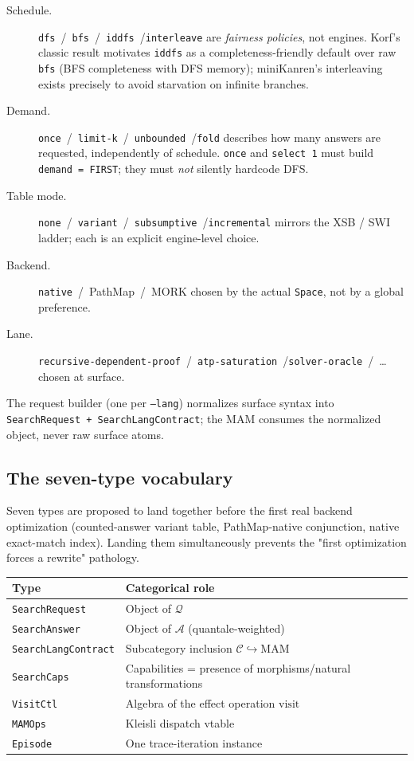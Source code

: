\documentclass[11pt]{article}
\newcommand{\code}[1]{\texttt{#1}}
\newcommand{\PathMap}{\textup{PathMap}}
\begin{document}
\begin{description}
\item[Schedule.]  \code{dfs}~/~\code{bfs}~/~\code{iddfs}~/\code{interleave}
  are \emph{fairness policies}, not engines.  Korf's classic result
  motivates \code{iddfs} as a completeness-friendly default over raw
  \code{bfs} (BFS completeness with DFS memory); miniKanren's
  interleaving exists precisely to avoid starvation on infinite
  branches.
\item[Demand.]  \code{once}~/~\code{limit-k}~/~\code{unbounded}~/\code{fold}
  describes how many answers are requested, independently of schedule.
  \code{once} and \code{select~1} must build \code{demand = FIRST};
  they must \emph{not} silently hardcode DFS.
\item[Table mode.]  \code{none}~/~\code{variant}~/~\code{subsumptive}~/\code{incremental}
  mirrors the XSB / SWI ladder; each is an explicit engine-level choice.
\item[Backend.]  \code{native}~/~\PathMap{}~/~MORK chosen by the
  actual \code{Space}, not by a global preference.
\item[Lane.]  \code{recursive-dependent-proof}~/~\code{atp-saturation}~/\code{solver-oracle}~/~\dots{}
  chosen at surface.
\end{description}

The request builder (one per \code{--lang}) normalizes surface syntax
into \code{SearchRequest~+~SearchLangContract}; the MAM consumes the
normalized object, never raw surface atoms.

\subsection{The seven-type vocabulary}

Seven types are proposed to land together before the first real
backend optimization (counted-answer variant table, \PathMap{}-native
conjunction, native exact-match index).  Landing them simultaneously
prevents the "first optimization forces a rewrite" pathology.

\begin{center}
\begin{tabular}{ll}
\toprule
\textbf{Type} & \textbf{Categorical role} \\
\midrule
\code{SearchRequest} & Object of $\mathcal{Q}$ \\
\code{SearchAnswer} & Object of $\mathcal{A}$ (quantale-weighted) \\
\code{SearchLangContract} & Subcategory inclusion $\mathcal{C} \hookrightarrow \mathrm{MAM}$ \\
\code{SearchCaps} & Capabilities = presence of morphisms/natural transformations \\
\code{VisitCtl} & Algebra of the effect operation $\mathrm{visit}$ \\
\code{MAMOps} & Kleisli dispatch vtable \\
\code{Episode} & One trace-iteration instance \\
\bottomrule
\end{tabular}
\end{center}
\end{document}
